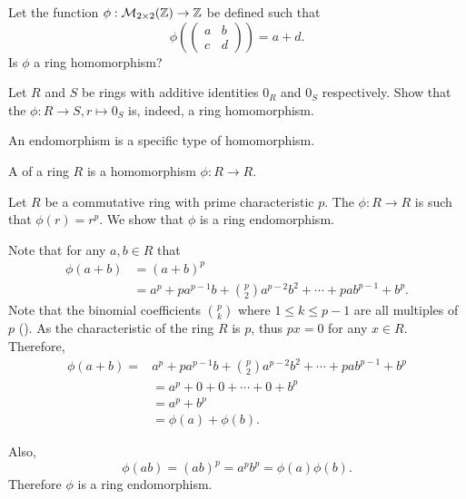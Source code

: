 \begin{exercise}
    Let the function $\phi: \mathcal{M}_{2\times2}(\mathbb{Z}) \to \mathbb{Z}$ be defined such that
    \[
        \phi\left(\begin{pmatrix}a&b\\c&d\end{pmatrix}\right) = a+d.
    \]
    Is $\phi$ a ring homomorphism?
\end{exercise}
\begin{exercise}
    Let $R$ and $S$ be rings with additive identities $0_R$ and $0_S$ respectively. Show that the  $\phi: R \to S, r \mapsto 0_S$ is, indeed, a ring homomorphism.
\end{exercise}

An endomorphism is a specific type of homomorphism.
\begin{definition}
    A  of a ring $R$ is a homomorphism $\phi: R \to R$.
\end{definition}
\begin{example}
    Let $R$ be a commutative ring with prime characteristic $p$. The  $\phi: R \to R$ is such that $\phi(r) = r^p$. We show that $\phi$ is a ring endomorphism.

    Note that for any $a, b \in R$ that
    \begin{align*}
        \phi(a+b) &= (a+b)^p\\
        &= a^p + pa^{p-1}b + {p \choose 2}a^{p-2}b^2 + \cdots + pab^{p-1} + b^p.
    \end{align*}
    Note that the binomial coefficients ${p \choose k}$ where $1 \leq k \leq p-1$ are all multiples of $p$ (). As the characteristic of the ring $R$ is $p$, thus $px = 0$ for any $x \in R$. Therefore,
    \begin{align*}
        \phi(a+b) = &a^p + pa^{p-1}b + {p \choose 2}a^{p-2}b^2 + \cdots + pab^{p-1} + b^p\\
        &= a^p + 0 + 0 + \cdots + 0 + b^p\\
        &= a^p + b^p\\
        &=\phi(a) + \phi(b).
    \end{align*}

    Also,
    \[
        \phi(ab) = (ab)^p = a^pb^p = \phi(a)\phi(b).
    \]
    Therefore $\phi$ is a ring endomorphism.
\end{example}

